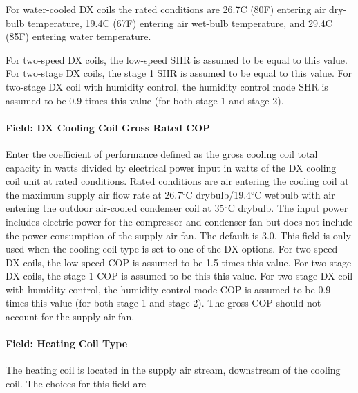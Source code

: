 For water-cooled DX coils the rated conditions are 26.7C (80F) entering air dry-bulb temperature, 19.4C (67F) entering air wet-bulb temperature, and 29.4C (85F) entering water temperature.

For two-speed DX coils, the low-speed SHR is assumed to be equal to this value. For two-stage DX coils, the stage 1 SHR is assumed to be equal to this value. For two-stage DX coil with humidity control, the humidity control mode SHR is assumed to be 0.9 times this value (for both stage 1 and stage 2).

\paragraph{Field: DX Cooling Coil Gross Rated COP}\label{field-dx-cooling-coil-gross-rated-cop}

Enter the coefficient of performance defined as the gross cooling coil total capacity in watts divided by electrical power input in watts of the DX cooling coil unit at rated conditions. Rated conditions are air entering the cooling coil at the maximum supply air flow rate at 26.7°C drybulb/19.4°C wetbulb with air entering the outdoor air-cooled condenser coil at 35°C drybulb. The input power includes electric power for the compressor and condenser fan but does not include the power consumption of the supply air fan. The default is 3.0. This field is only used when the cooling coil type is set to one of the DX options. For two-speed DX coils, the low-speed COP is assumed to be 1.5 times this value. For two-stage DX coils, the stage 1 COP is assumed to be this this value. For two-stage DX coil with humidity control, the humidity control mode COP is assumed to be 0.9 times this value (for both stage 1 and stage 2). The gross COP should not account for the supply air fan.

\paragraph{Field: Heating Coil Type}\label{field-heating-coil-type-3}

The heating coil is located in the supply air stream, downstream of the cooling coil. The choices for this field are

